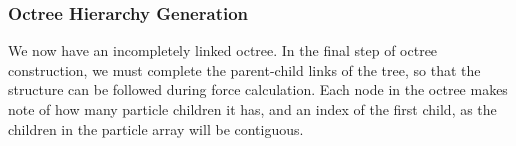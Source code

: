 \documentclass{thesis}
\begin{document}
\begin{algorithm}
\begin{algorithmic}
                \EndIf
            \Else
        
            \EndIf
        \EndFor
    \end{algorithmic}
\end{algorithm}

\subsubsection{Octree Hierarchy Generation}
We now have an incompletely linked octree. In the final step of octree construction, we must complete the parent-child links of the tree, so that the structure can be followed during force calculation. Each node in the octree makes note of how many particle children it has, and an index of the first child, as the children in the particle array will be contiguous. 
\end{document}

